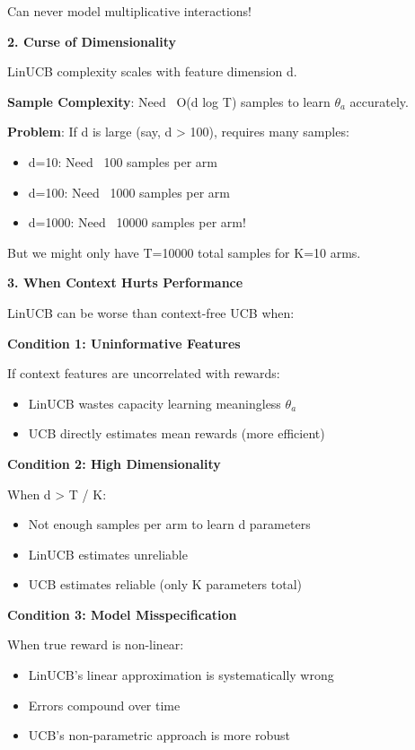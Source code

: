 \documentclass[12pt]{article}
\begin{document}
{{{Can never model multiplicative interactions!

\textbf{2. Curse of Dimensionality}

LinUCB complexity scales with feature dimension d.

\textbf{Sample Complexity}: Need ~O(d log T) samples to learn $\theta_a$ accurately.

\textbf{Problem}: If d is large (say, d > 100), requires many samples:
\begin{itemize}
\item d=10: Need ~100 samples per arm
\item d=100: Need ~1000 samples per arm
\item d=1000: Need ~10000 samples per arm!
\end{itemize}

But we might only have T=10000 total samples for K=10 arms.

\textbf{3. When Context Hurts Performance}

LinUCB can be worse than context-free UCB when:

\textbf{Condition 1: Uninformative Features}

If context features are uncorrelated with rewards:
\begin{itemize}
\item LinUCB wastes capacity learning meaningless $\theta_a$
\item UCB directly estimates mean rewards (more efficient)
\end{itemize}

\textbf{Condition 2: High Dimensionality}

When d > T / K:
\begin{itemize}
\item Not enough samples per arm to learn d parameters
\item LinUCB estimates unreliable
\item UCB estimates reliable (only K parameters total)
\end{itemize}

\textbf{Condition 3: Model Misspecification}

When true reward is non-linear:
\begin{itemize}
\item LinUCB's linear approximation is systematically wrong
\item Errors compound over time
\item UCB's non-parametric approach is more robust
\end{itemize}

}}}
\end{document}
